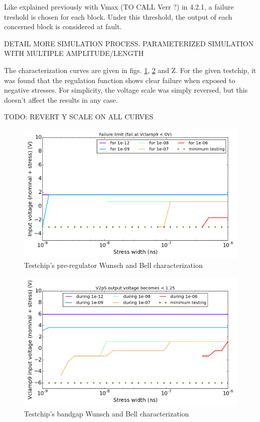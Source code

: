 Like explained previously with Vmax (TO CALL Verr ?) in 4.2.1, a failure treshold is chosen for each block.
Under this threshold, the output of each concerned block is considered at fault.

DETAIL MORE SIMULATION PROCESS. PARAMETERIZED SIMULATION WITH MULTIPLE AMPLITUDE/LENGTH

The characterization curves are given in figs. \ref{pre_regu_wb}, \ref{bandgap_wb} and Z.
For the given testchip, it was found that the regulation function shows clear failure when exposed to negative stresses.
For simplicity, the voltage scale was simply reversed, but this doesn't affect the results in any case.

TODO: REVERT Y SCALE ON ALL CURVES

\begin{figure}[!htbp]
  \centering
  \includegraphics[width=\textwidth]{src/4/figures/cz_vpre.png}
  \caption{Testchip's pre-regulator Wunsch and Bell characterization}
  \label{pre_regu_wb}
\end{figure}

\begin{figure}[!htbp]
  \centering
  \includegraphics[width=\textwidth]{src/4/figures/cz_bandgap.png}
  \caption{Testchip's bandgap Wunsch and Bell characterization}
  \label{bandgap_wb}
\end{figure}


